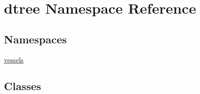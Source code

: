 \hypertarget{namespacedtree}{}\section{dtree Namespace Reference}
\label{namespacedtree}
\subsection*{Namespaces}
\begin{DoxyCompactItemize}
\item 
 \mbox{\hyperlink{namespacedtree_1_1vessels}{vessels}}
\end{DoxyCompactItemize}
\subsection*{Classes}
